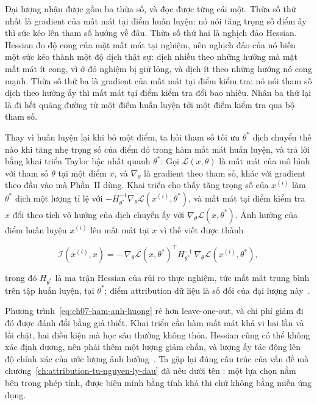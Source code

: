 Đại lượng nhận được gồm ba thừa số, và đọc được từng cái một. Thừa số thứ nhất
là gradient của mất mát tại điểm huấn luyện: nó nói tăng trọng số điểm ấy thì
sức kéo lên tham số hướng về đâu. Thừa số thứ hai là nghịch đảo Hessian. Hessian
đo độ cong của mặt mất mát tại nghiệm, nên nghịch đảo của nó biến một sức kéo
thành một độ dịch thật sự: dịch nhiều theo những hướng mà mặt mất mát ít cong,
vì ở đó nghiệm bị giữ lỏng, và dịch ít theo những hướng nó cong mạnh. Thừa số
thứ ba là gradient của mất mát tại điểm kiểm tra: nó nói tham số dịch theo hướng
ấy thì mất mát tại điểm kiểm tra đổi bao nhiêu. Nhân ba thứ lại là đi hết quãng
đường từ một điểm huấn luyện tới một điểm kiểm tra qua bộ tham số.

Thay
vì huấn luyện lại khi bỏ một điểm, ta hỏi tham số tối ưu $\theta^{*}$ dịch
chuyển thế nào khi tăng nhẹ trọng số của điểm đó trong hàm mất mát huấn luyện,
và trả lời bằng khai triển Taylor bậc nhất quanh $\theta^{*}$. Gọi
$\mathcal{L}(x,\theta)$ là mất mát của mô hình với tham số $\theta$ tại một
điểm $x$, và $\nabla_{\theta}$ là gradient theo tham số, khác với gradient theo
đầu vào mà Phần~II dùng. Khai triển cho thấy tăng trọng số của $x^{(i)}$ làm
$\theta^{*}$ dịch một lượng tỉ lệ với
$-H_{\theta^{*}}^{-1}\nabla_{\theta}\mathcal{L}(x^{(i)},\theta^{*})$, và mất
mát tại điểm kiểm tra $x$ đổi theo tích vô hướng của dịch chuyển ấy với
$\nabla_{\theta}\mathcal{L}(x,\theta^{*})$. Ảnh hưởng của điểm huấn luyện
$x^{(i)}$ lên mất mát tại $x$ vì thế viết được thành

\begin{equation}
\label{eq:ch07-ham-anh-huong}
\mathcal{I}(x^{(i)}, x)
= -\,\nabla_{\theta}\mathcal{L}(x,\theta^{*})^{\top}
   H_{\theta^{*}}^{-1}\,
   \nabla_{\theta}\mathcal{L}(x^{(i)},\theta^{*}),
\end{equation}

trong đó $H_{\theta^{*}}$ là ma trận Hessian của rủi ro thực nghiệm, tức mất
mát trung bình trên tập huấn luyện, tại $\theta^{*}$; điểm attribution dữ liệu
là số đối của đại lượng này~\autocite{p18unified}.

Phương trình~\ref{eq:ch07-ham-anh-huong} rẻ hơn leave-one-out, và chi phí giảm
đi đó được đánh đổi bằng giả thiết. Khai triển cần hàm mất mát khả vi hai lần và
lồi chặt, hai điều kiện mà học sâu thường không thỏa. Hessian cũng có thể không
xác định dương, nên phải thêm một lượng giảm chấn, và lượng ấy tác động lên độ
chính xác của ước lượng ảnh hưởng~\autocite{p18unified}. Ta gặp lại đúng cấu
trúc của vấn đề mà chương~\ref{ch:attribution-tu-nguyen-ly-dau} đã nêu dưới tên
: một lựa chọn nằm bên trong phép tính, được biện minh bằng tính khả thi
chứ không bằng miền ứng dụng.

